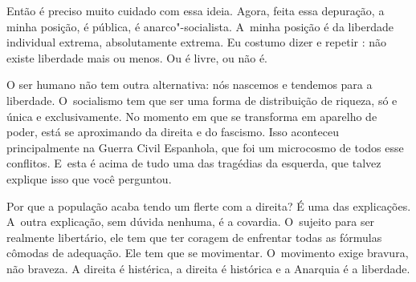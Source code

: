  

Então é preciso muito cuidado com essa ideia. Agora, feita essa
depuração, a minha posição, é pública, é anarco"-socialista. A~minha
posição é da liberdade individual extrema, absolutamente extrema. Eu
costumo dizer e repetir : não existe liberdade mais ou menos. Ou é
livre, ou não é.

 

O ser humano não tem outra alternativa: nós nascemos e tendemos para a
liberdade. O~socialismo tem que ser uma forma de distribuição de
riqueza, só e única e exclusivamente. No momento em que se transforma em
aparelho de poder, está se aproximando da direita e do fascismo. Isso
aconteceu principalmente na Guerra Civil Espanhola, que foi um
microcosmo de todos esse conflitos. E~esta é acima de tudo uma das
tragédias da esquerda, que talvez explique isso que você perguntou.

Por que a população acaba tendo um flerte com a direita? É uma das
explicações. A~outra explicação, sem dúvida nenhuma, é a covardia. O~sujeito para ser realmente libertário, ele tem que ter coragem de
enfrentar todas as fórmulas cômodas de adequação. Ele tem que se
movimentar. O~movimento exige bravura, não braveza. A direita é histérica, a direita é 
histórica e a Anarquia é a liberdade. 


 

\fechafala 
